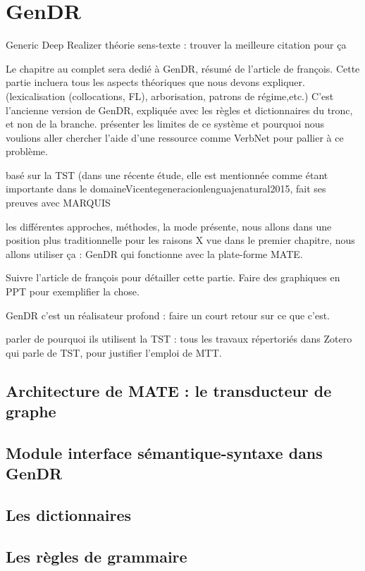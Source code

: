 
\chapter{GenDR}

Generic Deep Realizer \citep{lareau18}
théorie sens-texte : trouver la meilleure citation pour ça

Le chapitre au complet sera dedié à GenDR, résumé de l'article de françois.
Cette partie incluera tous les aspects théoriques que nous devons expliquer. (lexicalisation (collocations, FL), arborisation, patrons de régime,etc.)
C'est l'ancienne version de GenDR, expliquée avec les règles et dictionnaires du tronc, et non de la branche.
présenter les limites de ce système et pourquoi nous voulions aller chercher l'aide d'une ressource comme VerbNet pour pallier à ce problème.

basé sur la TST (dans une récente étude, elle est mentionnée comme étant importante dans le domaine{Vicentegeneracionlenguajenatural2015}, fait ses preuves avec MARQUIS

les différentes approches, méthodes, la mode présente, nous allons dans une position plus traditionnelle pour les raisons  X vue dans le premier chapitre, nous allons utiliser ça : GenDR qui fonctionne avec la plate-forme MATE.

Suivre l'article de françois pour détailler cette partie.
Faire des graphiques en PPT pour exemplifier la chose.

GenDR c'est un réalisateur profond : faire un court retour sur ce que c'est.

parler de pourquoi ils utilisent la TST : tous les travaux répertoriés dans Zotero qui parle de TST, pour justifier l'emploi de MTT.

\section{Architecture de MATE : le transducteur de graphe}

\section{Module interface sémantique-syntaxe dans GenDR}

\section{Les dictionnaires}
\section{Les règles de grammaire}

